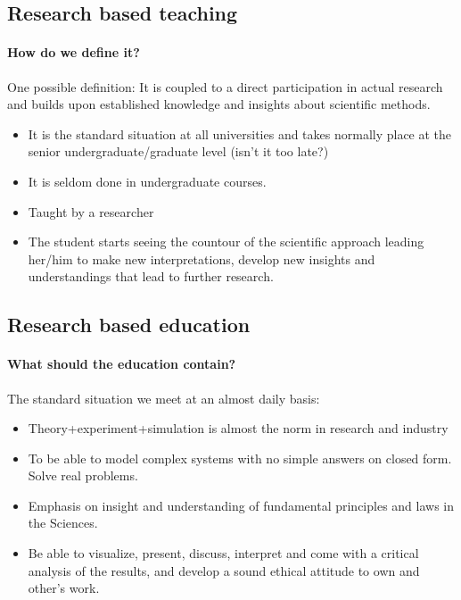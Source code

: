 \documentclass[%
twoside,                 %
final,                   %
10pt]{article}
\begin{document}
\noindent





\subsection{Research based teaching}

\paragraph{How do we define it?}
One possible definition: It is coupled to a direct participation in actual research and builds upon established
knowledge and insights about scientific methods.


\begin{itemize}
\item It is the standard situation at all universities  and takes normally place at the senior undergraduate/graduate level (isn't it too late?)

\item It is seldom done in undergraduate courses.

\item Taught by a researcher

\item The student starts seeing the countour of the scientific approach leading her/him to make new interpretations, develop new insights and understandings that lead  to further research.
\end{itemize}

\noindent





\subsection{Research based education}

\paragraph{What should the education contain?}
The standard situation we meet at an almost daily basis:

\begin{itemize}
\item Theory+experiment+simulation is almost the norm in research and industry

\item To be able to model complex systems with no simple answers on closed form. Solve real problems.

\item Emphasis on insight and understanding of fundamental principles and laws in the Sciences.

\item Be able to visualize, present, discuss, interpret and come with a critical analysis of the results, and develop a sound ethical attitude to own and other's work.
\end{itemize}
\end{document}
